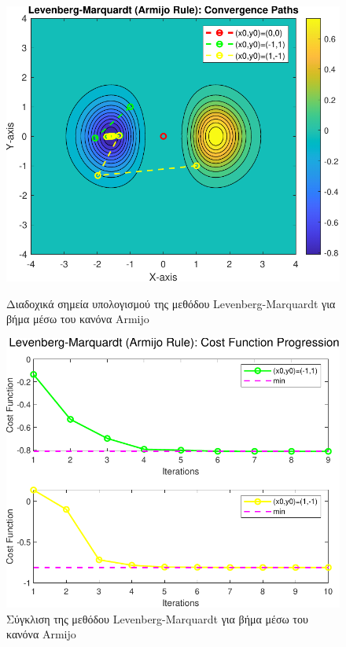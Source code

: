 \documentclass[a4paper,12pt]{article}
\begin{document}
\begin{figure}[h]
    \centering
    \begin{minipage}{0.47\textwidth}
        \centering
        \includegraphics[width=1\linewidth]{plot/levenberg_marquardt_armijo_rule_contour.pdf}
        \caption{\small Διαδοχικά σημεία υπολογισμού της μεθόδου  Levenberg-Marquardt  για βήμα μέσω του κανόνα  Armijo }
        \label{fig:levenberg_marquardt_armijo_rule_contour}
    \end{minipage} \hfill
    \begin{minipage}{0.47\textwidth}
        \centering
        \includegraphics[width=1\linewidth]{plot/levenberg_marquardt_armijo_rule_costs.pdf}
        \caption{\small Σύγκλιση της μεθόδου  Levenberg-Marquardt  για βήμα μέσω του κανόνα  Armijo }
        \label{fig:levenberg_marquardt_armijo_rule_costs}
    \end{minipage}
\end{figure}
\end{document}
